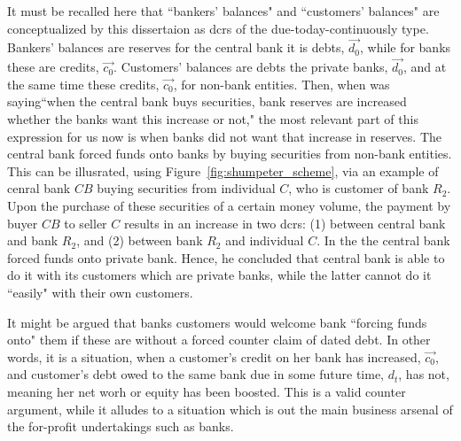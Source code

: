 It must be recalled here that ``bankers' balances" and ``customers' balances" are conceptualized by this dissertaion as \acfp{dcr} of the due-today-continuously type. Bankers' balances are reserves for the central bank it is debts, $\overrightarrow{d_0}$, while for banks these are credits, $\overrightarrow{c_0}$. Customers' balances are debts the private banks, $\overrightarrow{d_0}$, and at the same time these credits, $\overrightarrow{c_0}$, for non-bank entities. Then, when \citeauthor{schumpeter2014} was saying``when the central bank buys securities, bank reserves are increased whether the banks want this increase or not," the most relevant part of this expression for us now is when banks did not want that increase in reserves. The central bank forced funds onto banks by buying securities from non-bank entities. This can be illusrated, using Figure~\ref{fig:shumpeter_scheme}, via an example of cenral bank $CB$ buying securities from individual $C$, who is customer of bank $R_2$. Upon the purchase of these securities of a certain money volume, the payment by buyer $CB$ to seller $C$ results in an increase in two \acfp{dcr}: (1) between central bank and bank $R_2$, and (2) between bank $R_2$ and individual $C$. In the \citeauthor{schumpeter2014} the central bank forced funds onto private bank. Hence, he concluded that central bank is able to do it with its customers which are private banks, while the latter cannot do it ``easily" with their own customers. 

It might be argued that banks customers would welcome bank ``forcing funds onto" them if these are without a forced counter claim of dated debt. In other words, it is a situation, when a customer's credit on her bank has increased, $\overrightarrow{c_0}$, and customer's debt owed to the same bank due in some future time, $d_t$, has not, meaning her net worh or equity has been boosted. This is a valid counter argument, while it alludes to a situation which is out the main business arsenal of the for-profit undertakings such as banks. 

